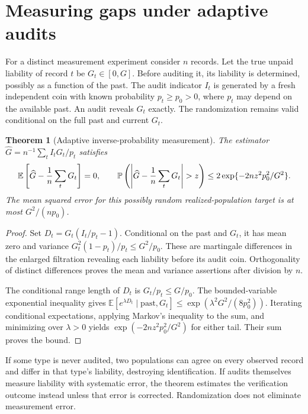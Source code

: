 \documentclass[11pt,a4paper]{article}
\newtheorem{theorem}{Theorem}[section]
\theoremstyle{definition}
\theoremstyle{remark}
\newcommand{\E}{\mathbb{E}}
\newcommand{\Prob}{\mathbb{P}}
\begin{document}
\section{Measuring gaps under adaptive audits}
For a distinct measurement experiment consider $n$ records. Let the true unpaid liability of record $t$ be $G_t\in[0,G]$. Before auditing it, its liability is determined, possibly as a function of the past. The audit indicator $I_t$ is generated by a fresh independent coin with known probability $p_t\ge p_0>0$, where $p_t$ may depend on the available past. An audit reveals $G_t$ exactly. The randomization remains valid conditional on the full past and current $G_t$.
\begin{theorem}[Adaptive inverse-probability measurement]
The estimator $\widehat G=n^{-1}\sum_t I_tG_t/p_t$ satisfies
\[
 \E\left[\widehat G-{1\over n}\sum_tG_t\right]=0,
 \qquad
 \Prob\left(\left|\widehat G-{1\over n}\sum_tG_t\right|>z\right)
 \le2\exp\{-2nz^2p_0^2/G^2\}.
\]
The mean squared error for this possibly random realized-population target is at most $G^2/(np_0)$.
\end{theorem}
\begin{proof}
Set $D_t=G_t(I_t/p_t-1)$. Conditional on the past and $G_t$, it has mean zero and variance $G_t^2(1-p_t)/p_t\le G^2/p_0$. These are martingale differences in the enlarged filtration revealing each liability before its audit coin. Orthogonality of distinct differences proves the mean and variance assertions after division by $n$.

The conditional range length of $D_t$ is $G_t/p_t\le G/p_0$. The bounded-variable exponential inequality gives
$\E[e^{\lambda D_t}\mid\text{past},G_t]\le\exp(\lambda^2G^2/(8p_0^2))$.
Iterating conditional expectations, applying Markov's inequality to the sum, and minimizing over $\lambda>0$ yields $\exp(-2nz^2p_0^2/G^2)$ for either tail. Their sum proves the bound.
\end{proof}
If some type is never audited, two populations can agree on every observed record and differ in that type's liability, destroying identification. If audits themselves measure liability with systematic error, the theorem estimates the verification outcome instead unless that error is corrected. Randomization does not eliminate measurement error.
\end{document}
